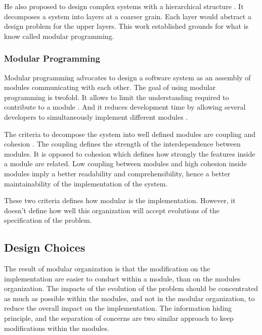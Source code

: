 
He also proposed to design complex systems with a hierarchical structure \cite{Dijkstra1968}.
It decomposes a system into layers at a coarser grain.
Each layer would abstract a design problem for the upper layers.
This work established grounds for what is know called modular programming.


\subsubsection{Modular Programming}

Modular programming advocates to design a software system as an assembly of modules communicating with each other.
The goal of using modular programming is twofold.
It allows to limit the understanding required to contribute to a module \cite{Stevens1974}.
And it reduces development time by allowing several developers to simultaneously implement different modules \cite{Wong2009,Cataldo2006}.

The criteria to decompose the system into well defined modules are coupling and cohesion \cite{Stevens1974}.
The coupling defines the strength of the interdependence between modules.
It is opposed to cohesion which defines how strongly the features inside a module are related.
Low coupling between modules and high cohesion inside modules imply a better readability and comprehensibility, hence a better maintainability of the implementation of the system.

These two criteria defines how modular is the implementation.
However, it doesn't define how well this organization will accept evolutions of the specification of the problem.



\subsection{Design Choices}

The result of modular organization is that the modification on the implementation are easier to conduct within a module, than on the modules organization.
The impacts of the evolution of the problem should be concentrated as much as possible within the modules, and not in the modular organization, to reduce the overall impact on the implementation.
The information hiding principle, and the separation of concerns are two similar approach to keep modifications within the modules.


